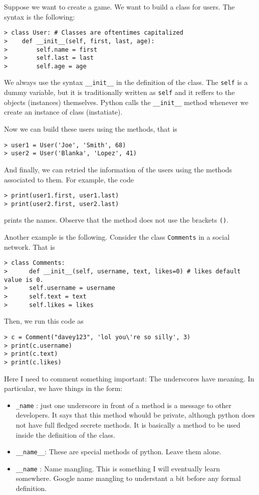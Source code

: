 Suppose we want to create a game. We want to build a class for users. The syntax is the following:
\begin{verbatim}
> class User: # Classes are oftentimes capitalized
>    def __init__(self, first, last, age):
>        self.name = first
>        self.last = last
>        self.age = age
\end{verbatim} 

We always use the syntax \verb|__init__| in the definition of the class. The \verb|self| is a dummy variable, but it is traditionally written as \verb|self| and it reffers to the objects (instances) themselves. Python calls the \verb|__init__| method whenever we create an instance of class (instatiate).

Now we can build these users using the methods, that is 
\begin{verbatim}
> user1 = User('Joe', 'Smith', 68)
> user2 = User('Blanka', 'Lopez', 41)
\end{verbatim}

And finally, we can retried the information of the users using the methods associated to them. For example, the code
\begin{verbatim}
> print(user1.first, user1.last)
> print(user2.first, user2.last)
\end{verbatim}
prints the names. Observe that the method does not use the brackets \verb|()|.

Another example is the following. Consider the class \verb|Comments| in a social network. That is 
\begin{verbatim}
> class Comments:
>      def __init__(self, username, text, likes=0) # likes default value is 0. 
>      self.username = username	
>      self.text = text
>      self.likes = likes
\end{verbatim}
Then, we run this code as
\begin{verbatim}
> c = Comment("davey123", 'lol you\'re so silly', 3)
> print(c.username)
> print(c.text)
> print(c.likes)
\end{verbatim}

\begin{shaded}
Here I need to comment something important: The underscores have meaning. In particular, we have things in the form: 
\begin{itemize}
	\item \verb|_name| : just one underscore in front of a method is a message to other developers. It says that this method whould be private, although python does not have full fledged secrete methods. It is basically a method to be used inside the definition of the class. 
	\item \verb|__name__|: These are special methods of python. Leave them alone. 
	\item \verb|__name| : Name mangling. This is something I will eventually learn somewhere. Google name mangling to understant a bit before any formal definition.
\end{itemize}
\end{shaded}	




